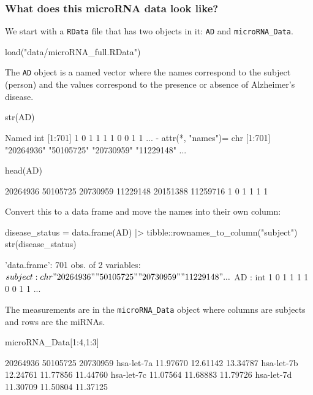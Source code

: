 \documentclass[a4paper]{article}\usepackage[]{graphicx}\usepackage[]{xcolor}
\begin{document}
\subsubsection{What does this microRNA data look like?}
We start with a \lstinline|RData| file that has two objects in it: \lstinline|AD| and \lstinline|microRNA_Data|.
\begin{Schunk}
\begin{Sinput}
load("data/microRNA_full.RData")
\end{Sinput}
\end{Schunk}
The \lstinline|AD| object is a named vector where the names correspond to the subject (person) and the values correspond to the presence or absence of Alzheimer's disease.
\begin{Schunk}
\begin{Sinput}
str(AD)
\end{Sinput}
\begin{Soutput}
 Named int [1:701] 1 0 1 1 1 1 0 0 1 1 ...
 - attr(*, "names")= chr [1:701] "20264936" "50105725" "20730959" "11229148" ...
\end{Soutput}
\begin{Sinput}
head(AD)
\end{Sinput}
\begin{Soutput}
20264936 50105725 20730959 11229148 20151388 11259716 
       1        0        1        1        1        1 
\end{Soutput}
\end{Schunk}
Convert this to a data frame and move the names into their own column:
\begin{Schunk}
\begin{Sinput}
disease_status = data.frame(AD) |> 
  tibble::rownames_to_column("subject")
str(disease_status)
\end{Sinput}
\begin{Soutput}
'data.frame':	701 obs. of  2 variables:
 $ subject: chr  "20264936" "50105725" "20730959" "11229148" ...
 $ AD     : int  1 0 1 1 1 1 0 0 1 1 ...
\end{Soutput}
\end{Schunk}
The measurements are in the \lstinline|microRNA_Data| object where columns are subjects and rows are the miRNAs.
\begin{Schunk}
\begin{Sinput}
microRNA_Data[1:4,1:3]
\end{Sinput}
\begin{Soutput}
           20264936 50105725 20730959
hsa-let-7a 11.97670 12.61142 13.34787
hsa-let-7b 12.24761 11.77856 11.44760
hsa-let-7c 11.07564 11.68883 11.79726
hsa-let-7d 11.30709 11.50804 11.37125
\end{Soutput}
\end{Schunk}
\end{document}
